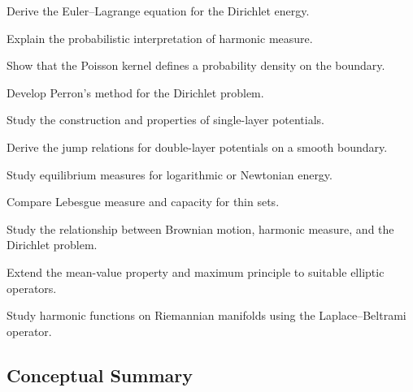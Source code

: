 \begin{exercise}[3]
Derive the Euler--Lagrange equation for the Dirichlet energy.
\end{exercise}

\begin{exercise}[3]
Explain the probabilistic interpretation of harmonic measure.
\end{exercise}

\begin{exercise}[3]
Show that the Poisson kernel defines a probability density on the
boundary.
\end{exercise}

\begin{exercise}[4]
Develop Perron's method for the Dirichlet problem.
\end{exercise}

\begin{exercise}[4]
Study the construction and properties of single-layer potentials.
\end{exercise}

\begin{exercise}[4]
Derive the jump relations for double-layer potentials on a smooth
boundary.
\end{exercise}

\begin{exercise}[4]
Study equilibrium measures for logarithmic or Newtonian energy.
\end{exercise}

\begin{exercise}[4]
Compare Lebesgue measure and capacity for thin sets.
\end{exercise}

\begin{exercise}[4]
Study the relationship between Brownian motion, harmonic measure, and the
Dirichlet problem.
\end{exercise}

\begin{exercise}[4]
Extend the mean-value property and maximum principle to suitable elliptic
operators.
\end{exercise}

\begin{exercise}[4]
Study harmonic functions on Riemannian manifolds using the
Laplace--Beltrami operator.
\end{exercise}

\subsection{Conceptual Summary}
\label{subsec:potential-theory-summary}

